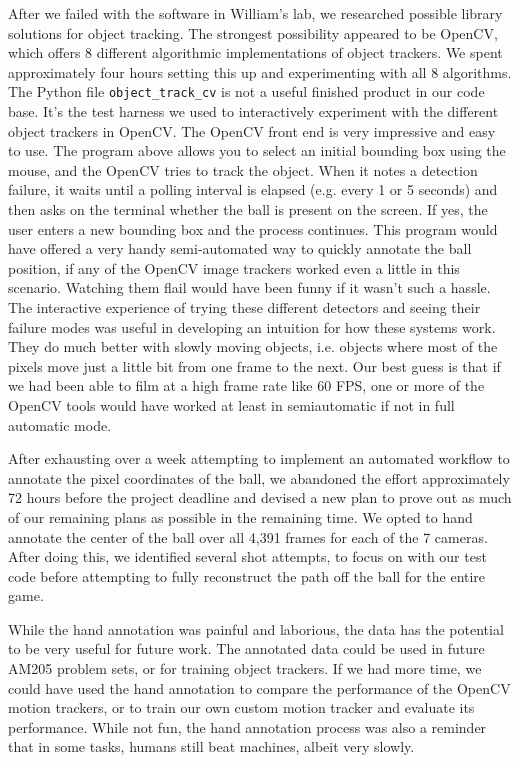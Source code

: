 \documentclass{article}
\begin{document}
After we failed with the software in William's lab, we researched possible library
solutions for object tracking.  The strongest possibility appeared to be OpenCV,
which offers 8 different algorithmic implementations of object trackers.
We spent approximately four hours setting this up and experimenting with all 8 algorithms.  
The Python file \texttt{object\_track\_cv} is not a useful finished product in our code base.
It's the test harness we used to interactively experiment with 
the different object trackers in OpenCV.  
The OpenCV front end is very impressive and easy to use.  
The program above allows you to select an initial bounding box using the mouse,
and the OpenCV tries to track the object.  
When it notes a detection failure, it waits until a polling interval is elapsed 
(e.g. every 1 or 5 seconds) and then asks on the terminal 
whether the ball is present on the screen.  
If yes, the user enters a new bounding box and the process continues.
This program would have offered a very handy semi-automated way to quickly
annotate the ball position, if any of the OpenCV image trackers 
worked even a little in this scenario.  
Watching them flail would have been funny if it wasn't such a hassle.
The interactive experience of trying these different detectors and seeing their
failure modes was useful in developing an intuition for how these systems work.
They do much better with slowly moving objects, i.e. objects 
where most of the pixels move just a little bit from one frame to the next.
Our best guess is that if we had been able to film at a high frame rate like 60 FPS,
one or more of the OpenCV tools would have worked at least in semiautomatic
if not in full automatic mode.

After exhausting over a week attempting to implement an automated workflow to 
annotate the pixel coordinates of the ball, we abandoned the effort approximately
72 hours before the project deadline and devised a new plan to prove out as much
of our remaining plans as possible in the remaining time.
We opted to hand annotate the center of the ball over all 4,391 frames for each of the 7 cameras.
After doing this, we identified several shot attempts, to focus on with our test code 
before attempting to fully reconstruct the path off the ball for the entire game.

While the hand annotation was painful and laborious, the data has the potential to be very useful for future work. 
The annotated data could be used in future AM205 problem sets, or for training object trackers. 
If we had more time, we could have used the hand annotation to compare the performance of the OpenCV motion trackers, 
or to train our own custom motion tracker and evaluate its performance. 
While not fun, the hand annotation process was also a reminder that in some tasks, humans still beat machines, albeit very slowly.
\end{document}
